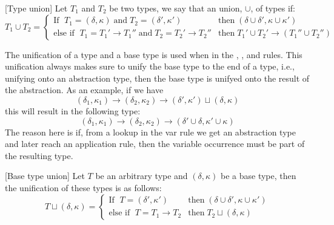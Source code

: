 \documentclass[../../master.tex]{subfiles}
\begin{document}
\begin{definition}{[Type union]}
	Let $T_1$ and $T_2$ be two types, we say that an union, $\cup$, of types if:
	\begin{equation*}
		T_1\cup T_2=
		\left\{\begin{matrix}
			\mbox{If } \; T_1=(\delta,\kappa) \;\mbox{and}\; T_2=(\delta',\kappa')  & \mbox{then} \; (\delta\cup\delta',\kappa\cup\kappa')\\
			\mbox{else if } \; T_1=T_1'\rightarrow T_1''\;\mbox{and}\;T_2=T_2'\rightarrow T_2'' & \mbox{then} \; T_1'\cup T_2'\rightarrow (T_1''\cup T_2'')
		\end{matrix}\right.
	\end{equation*}
\end{definition}

The unification of a type and a base type is used when in the , , and  rules.
This unification always makes sure to unify the base type to the end of a type, i.e., unifying onto an abstraction type, then the base type is unifyed onto the result of the abstraction.
As an example, if we have 
$$(\delta_1,\kappa_1)\rightarrow(\delta_2,\kappa_2)\rightarrow(\delta',\kappa')\sqcup(\delta,\kappa)$$
this will result in the following type:
$$(\delta_1,\kappa_1)\rightarrow(\delta_2,\kappa_2)\rightarrow(\delta'\cup\delta,\kappa'\cup\kappa)$$
The reason here is if, from a lookup in the var rule we get an abstraction type and later reach an application rule, then the variable occurrence must be part of the resulting type.

\begin{definition}{[Base type union]}
	Let $T$ be an arbitrary type and $(\delta,\kappa)$ be a base type, then the unification of these types is as follows:
	\begin{equation*}
		T\sqcup (\delta,\kappa)=
		\left\{\begin{matrix}
			\mbox{If } \; T=(\delta',\kappa')  & \mbox{then} \; (\delta\cup\delta',\kappa\cup\kappa')\\
			\mbox{else if } \; T=T_1\rightarrow T_2 & \mbox{then} \; T_2\sqcup (\delta,\kappa)
		\end{matrix}\right.
	\end{equation*}
\end{definition}
\end{document}
